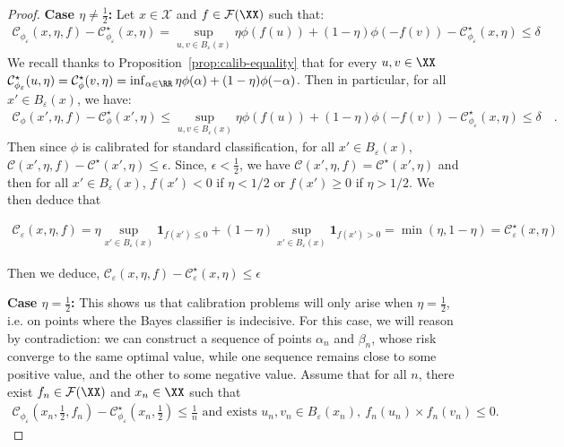 \begin{proof}
\textbf{Case $\eta\neq \frac12$:} Let $x\in\mathcal{X}$ and $f\in \mathcal{F}(\XX)$ such that: 
\begin{align*}
\mathcal{C}_{\phi_\varepsilon}(x,\eta,f) - \mathcal{C}_{\phi_\varepsilon}^\star(x,\eta)
 = \sup_{u,v\in B_\varepsilon(x)}\eta\phi (f(u))+(1-\eta)\phi (-f(v))-\mathcal{C}_{\phi_\varepsilon}^\star(x,\eta)\leq \delta 
\end{align*}
We recall thanks to Proposition~\ref{prop:calib-equality} that for every $u,v\in\XX$ 
$\mathcal{C}_{\phi_\varepsilon}^\star(u,\eta) =\mathcal{C}_\phi^\star(v,\eta)=\inf_{\alpha\in\RR}\eta \phi(\alpha)+(1-\eta)\phi(-\alpha)$. Then in particular, for all $x'\in B_\varepsilon(x)$, we have:
\begin{align*}
    \mathcal{C}_{\phi}(x',\eta,f) - \mathcal{C}_{\phi}^\star(x',\eta)\leq \sup_{u,v\in B_\varepsilon(x)}\eta\phi (f(u))+(1-\eta)\phi (-f(v))-\mathcal{C}_{\phi_\varepsilon}^\star(x,\eta)\leq \delta\quad.
\end{align*} 
Then since $\phi$ is calibrated for standard classification, for all $x'\in B_\varepsilon(x)$, $\mathcal{C}(x',\eta,f) - \mathcal{C}^\star(x',\eta)\leq \epsilon$. Since,  $\epsilon<\frac{1}{2}$, we have $\mathcal{C}(x',\eta,f) = \mathcal{C}^\star(x',\eta)$ and then for all $x'\in B_\varepsilon(x)$, $f(x')< 0$  if $\eta<1/2$ or $f(x')\geq0$  if $\eta>1/2$. We then deduce that 

\begin{align*}
   \mathcal{C}_{\varepsilon}(x,\eta,f) = \eta \sup_{x'\in B_\varepsilon(x)} \mathbf{1}_{f(x')\leq 0 } +(1-\eta) \sup_{x'\in B_\varepsilon(x)} \mathbf{1}_{f(x')> 0 }
    = \min(\eta,1-\eta)
    = \mathcal{C}_{\varepsilon}^\star(x,\eta)
\end{align*}


Then we deduce, $\mathcal{C}_{\varepsilon}(x,\eta,f) - \mathcal{C}_{\varepsilon}^\star(x,\eta)\leq \epsilon$



\textbf{Case $\eta=\frac12$:} This shows us that calibration problems will only arise when $\eta = \frac{1}{2}$, i.e. on points where the Bayes classifier is indecisive. For this case, we will reason by contradiction: we can construct a sequence of points $\alpha_n$ and $\beta_n$, whose risk converge to the same optimal value, while one sequence remains close to some positive value, and the other to some negative value. Assume that for all $n$, there exist $f_n\in\mathcal{F}(\XX)$ and $x_n\in\XX$ such that 
\begin{align*}
    \mathcal{C}_{\phi_\varepsilon}(x_n,\frac12,f_n) - \mathcal{C}_{\phi_\varepsilon}^\star(x_n,\frac12)\leq \frac1n\text{ and exists $u_n,v_n\in B_\varepsilon(x_n)$},~ f_n(u_n)\times f_n(v_n)\leq 0.
\end{align*}


\end{proof}
